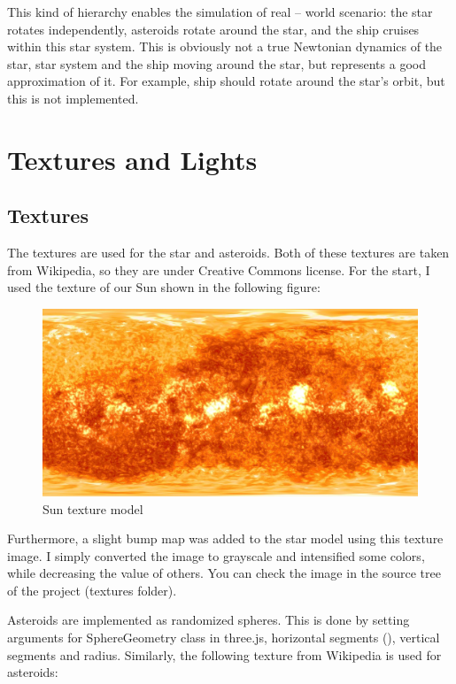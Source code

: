 \documentclass[12pt,a4paper]{report}
\begin{document}
	This kind of hierarchy enables the simulation of real -- world scenario: the star rotates independently, asteroids rotate around the star, and the ship cruises within this star system. This is obviously not a true Newtonian dynamics of the star, star system and the ship moving around the star, but represents a good approximation of it. For example, ship should rotate around the star's orbit, but this is not implemented.
	
	\section{Textures and Lights}
	
	\subsection{Textures}
	
	The textures are used for the star and asteroids. Both of these textures are taken from Wikipedia, so they are under Creative Commons license. For the start, I used the texture of our Sun shown in the following figure:
	
	 \begin{figure}[H]
	 	\centering
	 	\includegraphics[width=0.9\linewidth]{img/sun}
	 	\caption{Sun texture model}
	 	\label{fig:sun}
	 \end{figure}
 
 	Furthermore, a slight bump map was added to the star model using this texture image. I simply converted the image to grayscale and intensified some colors, while decreasing the value of others. You can check the image in the source tree of the project (textures folder).
 	
 	Asteroids are implemented as randomized spheres. This is done by setting arguments for SphereGeometry class in three.js, horizontal segments (), vertical segments and radius. Similarly, the following texture from Wikipedia is used for asteroids:
 	
\end{document}
